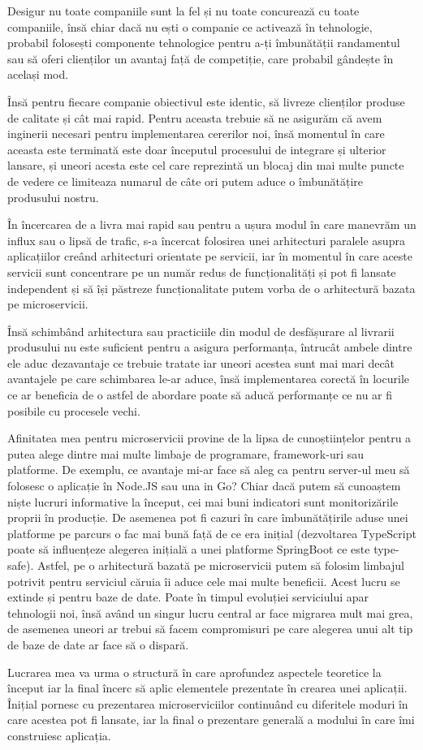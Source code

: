 Desigur nu toate companiile sunt la fel și nu toate concurează cu toate companiile, însă chiar dacă 
nu ești o companie ce activează în tehnologie, probabil folosești componente tehnologice pentru a-ți
îmbunătății randamentul sau să oferi clienților un avantaj față de competiție, care probabil gândește în
același mod.

Însă pentru fiecare companie obiectivul este identic, să livreze clienților produse de calitate și cât mai 
rapid. Pentru aceasta trebuie să ne asigurăm că avem inginerii necesari pentru implementarea cererilor noi,
însă momentul în care aceasta este terminată este doar începutul procesului de integrare și ulterior lansare,
și uneori acesta este cel care reprezintă un blocaj din mai multe puncte de vedere ce limiteaza numarul de câte
ori putem aduce o îmbunătățire produsului nostru.

În încercarea de a livra mai rapid sau pentru a ușura modul în care manevrăm un influx sau o lipsă de trafic,
s-a încercat folosirea unei arhitecturi paralele asupra aplicațiilor creând arhitecturi orientate pe servicii, 
iar în momentul în care aceste servicii sunt concentrare pe un număr redus de funcționalități și pot fi lansate
independent și să își păstreze funcționalitate putem vorba de o arhitectură bazata pe microservicii.

Însă schimbând arhitectura sau practiciile din modul de desfășurare al livrarii produsului nu este suficient
pentru a asigura performanța, întrucât ambele dintre ele aduc dezavantaje ce trebuie tratate iar uneori 
acestea sunt mai mari decât avantajele pe care schimbarea le-ar aduce, însă implementarea corectă în locurile
ce ar beneficia de o astfel de abordare poate să aducă performanțe ce nu ar fi posibile cu procesele vechi.

Afinitatea mea pentru microservicii provine de la lipsa de cunoștiințelor pentru a putea alege dintre mai
multe limbaje de programare, framework-uri sau platforme. De exemplu, ce avantaje mi-ar face să aleg ca 
pentru server-ul meu să folosesc o aplicație în Node.JS sau una in Go? Chiar dacă putem să cunoaștem 
niște lucruri informative la început, cei mai buni indicatori sunt monitorizările proprii în producție. De 
asemenea pot fi cazuri în care îmbunătățirile aduse unei platforme pe parcurs o fac mai bună față de ce era
inițial (dezvoltarea TypeScript poate să influențeze alegerea inițială a unei platforme SpringBoot ce este type-safe).
Astfel, pe o arhitectură bazată pe microservicii putem să folosim limbajul potrivit pentru serviciul căruia
îi aduce cele mai multe beneficii. Acest lucru se extinde și pentru baze de date. Poate în timpul evoluției 
serviciului apar tehnologii noi, însă având un singur lucru central ar face migrarea mult mai grea, de asemenea
uneori ar trebui să facem compromisuri pe care alegerea unui alt tip de baze de date ar face să o dispară.

Lucrarea mea va urma o structură în care aprofundez aspectele teoretice la început iar la final încerc să
aplic elementele prezentate în crearea unei aplicații. Înițial pornesc cu prezentarea microserviciilor
continuând cu diferitele moduri în care acestea pot fi lansate, iar
la final o prezentare generală a modului în care îmi construiesc aplicația.
